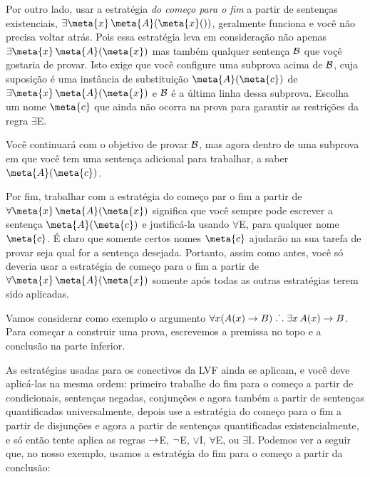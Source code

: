 Por outro lado, usar a estrat\'egia \emph{do come\c co para o fim} a partir de senten\c cas existenciais, $\exists \meta{x}\, \atom{\meta{A}(\meta{x}})$, geralmente funciona e voc\^e n\~ao precisa voltar atr\'as. Pois essa estrat\'egia  leva em considera\c c\~ao n\~ao apenas $\exists \meta{x}\, \atom{\meta{A}}{\meta{x}}$  mas tamb\'em qualquer senten\c ca $\mathcal{B}$ que vo\c c\^e gostaria de provar. Isto exige que voc\^e configure uma subprova acima de $\mathcal{B}$, cuja suposi\c c\~ao \'e uma inst\^ancia de substitui\c c\~ao $\atom{\meta{A}}{\meta{c}}$ de $\exists \meta{x}\, \atom{\meta{A}}{\meta{x}}$ e $\mathcal{B}$  \'e a \'ultima linha dessa subprova. Escolha um nome $\meta{c}$ que ainda n\~ao ocorra na prova para garantir as restri\c c\~oes da regra $\exists$E.
 
\begin{fitchproof}
	\ellipsesline
	\ellipsesline
	\open
	\ellipsesline
	\close
\end{fitchproof}
Voc\^e continuar\'a com o objetivo de provar $\mathcal{B}$, mas agora dentro de uma subprova em que voc\^e tem uma senten\c ca adicional para trabalhar, a saber~$\atom{\meta{A}}{\meta{c}}$.

Por fim, trabalhar com a estrat\'egia do come\c co par o fim a partir de $\forall \meta{x}\, \atom{\meta{A}}{\meta{x}}$ significa que voc\^e sempre pode escrever a senten\c ca $\atom{\meta{A}}{\meta{c}}$ e justific\'a-la usando $\forall$E, para qualquer nome~$\meta{c}$.  \'E claro que somente certos nomes $\meta{c}$ ajudar\~ao na sua tarefa de provar seja qual for a senten\c ca desejada. Portanto, assim como antes, voc\^e s\'o deveria  usar a estrat\'egia de come\c co para o fim a partir de  $\forall \meta{x}\, \atom{\meta{A}}{\meta{x}}$ somente ap\'os todas as outras estrat\'egias terem sido aplicadas.

Vamos considerar como exemplo o argumento $\forall x(\mathord{A}(x) \rightarrow B) \mathrel{\ldotp\dot{}\,\ldotp} \exists x\,\mathord{A}(x) \rightarrow B$. Para come\c car a construir uma prova, escrevemos a premissa no topo e a conclus\~ao na parte inferior.
\begin{fitchproof}
\ellipsesline
{}
\end{fitchproof}
As estrat\'egias usadas para os conectivos da LVF ainda se aplicam, e voc\^e deve aplic\'a-las na mesma ordem: primeiro trabalhe do fim para o come\c co a partir de condicionais, senten\c cas negadas, conjun\c c\~oes e agora tamb\'em a partir de  senten\c cas quantificadas universalmente, depois use a estrat\'egia do come\c co para o fim a partir de  disjun\c c\~oes e agora a partir de senten\c cas quantificadas existencialmente, e s\'o ent\~ao tente aplica as regras $\rightarrow$E, $\neg$E, $\lor$I, $\forall$E, ou $\exists$I. Podemos ver a seguir que, no nosso exemplo, usamos a estrat\'egia do fim para o come\c co a partir da conclus\~ao:
 
